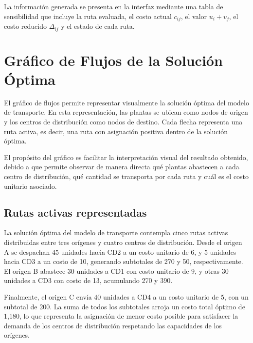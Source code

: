 \documentclass{article}
\begin{document}
	La información generada se presenta en la interfaz mediante una tabla de sensibilidad que
	incluye la ruta evaluada, el costo actual $c_{ij}$, el valor $u_i+v_j$, el costo reducido
	$\Delta_{ij}$ y el estado de cada ruta.
	
	\section{Gráfico de Flujos de la Solución Óptima}
	
	El gráfico de flujos permite representar visualmente la solución óptima del modelo de
	transporte. En esta representación, las plantas se ubican como nodos de origen y los
	centros de distribución como nodos de destino. Cada flecha representa una ruta activa, es
	decir, una ruta con asignación positiva dentro de la solución óptima.
	
	El propósito del gráfico es facilitar la interpretación visual del resultado obtenido,
	debido a que permite observar de manera directa qué plantas abastecen a cada centro de
	distribución, qué cantidad se transporta por cada ruta y cuál es el costo unitario
	asociado.
	
	\subsection{Rutas activas representadas}
	
	La solución óptima del modelo de transporte contempla cinco rutas activas distribuidas entre tres orígenes y cuatro centros de distribución. Desde el origen A se despachan 45 unidades hacia CD2 a un costo unitario de 6, y 5 unidades hacia CD3 a un costo de 10, generando subtotales de 270 y 50, respectivamente. El origen B abastece 30 unidades a CD1 con costo unitario de 9, y otras 30 unidades a CD3 con costo de 13, acumulando 270 y 390. 
	
	Finalmente, el origen C
	envía 40 unidades a CD4 a un costo unitario de 5, con un subtotal de 200. La suma de todos los subtotales arroja un costo total óptimo de 1{,}180, lo que representa la asignación de menor costo posible para satisfacer la demanda de los centros de distribución respetando las capacidades de los orígenes.
	
\end{document}
